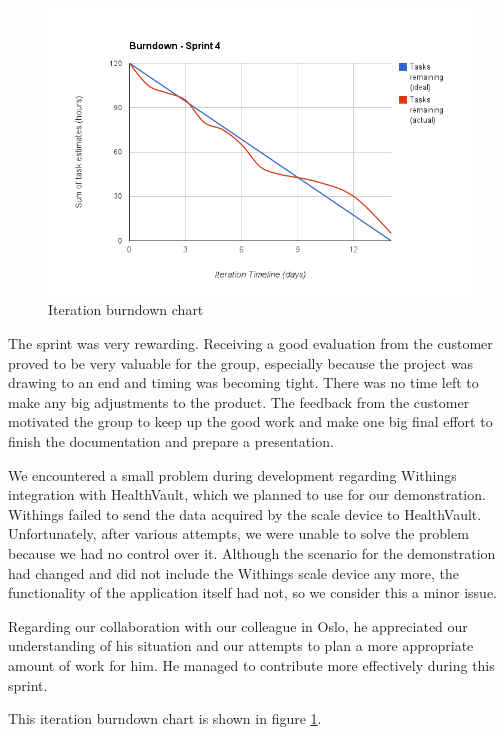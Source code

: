 \begin{figure}
\centering
\includegraphics[scale=0.60]{../Figures/burndownSprint4.png}
\caption{Iteration burndown chart}
\label{figure:burndownsprint4}
\end{figure}

The sprint was very rewarding.
Receiving a good evaluation from the customer proved to be very valuable for the group, especially because the project was drawing to an end and timing was becoming tight.
There was no time left to make any big adjustments to the product.
The feedback from the customer motivated the group to keep up the good work and make one big final effort to finish the documentation and prepare a presentation.

We encountered a small problem during development regarding Withings integration with HealthVault, which we planned to use for our demonstration. 
Withings failed to send the data acquired by the scale device to HealthVault. 
Unfortunately, after various attempts, we were unable to solve the problem because we had no control over it.
Although the scenario for the demonstration had changed and did not include the Withings scale device any more, the functionality of the application itself had not, so we consider this a minor issue.

Regarding our collaboration with our colleague in Oslo, he appreciated our understanding of his situation and our attempts to plan a more appropriate amount of work for him. 
He managed to contribute more effectively during this sprint.

This iteration burndown chart is shown in figure \ref{figure:burndownsprint4}.
\clearpage
